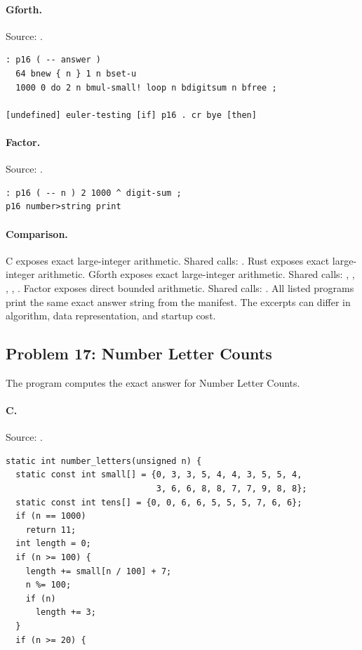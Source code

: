\paragraph{Gforth.} Source: .
\begin{lstlisting}
: p16 ( -- answer )
  64 bnew { n } 1 n bset-u
  1000 0 do 2 n bmul-small! loop n bdigitsum n bfree ;

[undefined] euler-testing [if] p16 . cr bye [then]
\end{lstlisting}

\paragraph{Factor.} Source: .
\begin{lstlisting}
: p16 ( -- n ) 2 1000 ^ digit-sum ;
p16 number>string print
\end{lstlisting}

\paragraph{Comparison.}
C exposes exact large-integer arithmetic. Shared calls: \texttt{}. Rust exposes exact large-integer arithmetic. Gforth exposes exact large-integer arithmetic. Shared calls: \texttt{}, \texttt{}, \texttt{}, \texttt{}, \texttt{}. Factor exposes direct bounded arithmetic. Shared calls: \texttt{}.
All listed programs print the same exact answer string from the manifest. The excerpts can differ in algorithm, data representation, and startup cost.

\subsection{Problem 17: Number Letter Counts}
\label{walkthrough:p17}
The program computes the exact answer for Number Letter Counts.

\paragraph{C.} Source: .
\begin{lstlisting}
static int number_letters(unsigned n) {
  static const int small[] = {0, 3, 3, 5, 4, 4, 3, 5, 5, 4,
                              3, 6, 6, 8, 8, 7, 7, 9, 8, 8};
  static const int tens[] = {0, 0, 6, 6, 5, 5, 5, 7, 6, 6};
  if (n == 1000)
    return 11;
  int length = 0;
  if (n >= 100) {
    length += small[n / 100] + 7;
    n %= 100;
    if (n)
      length += 3;
  }
  if (n >= 20) {
\end{lstlisting}

